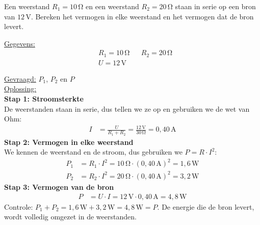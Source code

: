 \documentclass{ximera}
\begin{document}
\begin{example}[foldable=true,title={Voorbeeld: vermogen in een serieschakeling}]\nl
    Een weerstand $R_1 = 10\,\mathrm{\Omega}$ en een weerstand $R_2 = 20\,\mathrm{\Omega}$ staan in serie op een bron van $12\,\mathrm{V}$. Bereken het vermogen in elke weerstand en het vermogen dat de bron levert.

    \begin{solution}\nl
        \underline{Gegevens:}
        \begin{align*}
            & R_1 = 10\,\mathrm{\Omega} & & R_2 = 20\,\mathrm{\Omega} \\
            & U = 12\,\mathrm{V} & &
        \end{align*}

        \underline{Gevraagd:} $P_1$, $P_2$ en $P$ \\

        \underline{Oplossing:}\\
        \textbf{Stap 1: Stroomsterkte}\\
        De weerstanden staan in serie, dus tellen we ze op en gebruiken we de wet van Ohm:
        \begin{align*}
            I &= \frac{U}{R_1 + R_2} = \frac{12\,\mathrm{V}}{30\,\mathrm{\Omega}} = 0{,}40\,\mathrm{A}
        \end{align*}
        \textbf{Stap 2: Vermogen in elke weerstand}\\
        We kennen de weerstand en de stroom, dus gebruiken we $P = R \cdot I^{2}$:
        \begin{align*}
            P_1 &= R_1 \cdot I^{2} = 10\,\mathrm{\Omega} \cdot (0{,}40\,\mathrm{A})^{2} = \boxed{1{,}6\,\mathrm{W}} \\
            P_2 &= R_2 \cdot I^{2} = 20\,\mathrm{\Omega} \cdot (0{,}40\,\mathrm{A})^{2} = \boxed{3{,}2\,\mathrm{W}}
        \end{align*}
        \textbf{Stap 3: Vermogen van de bron}
        \begin{align*}
            P &= U \cdot I = 12\,\mathrm{V} \cdot 0{,}40\,\mathrm{A} = \boxed{4{,}8\,\mathrm{W}}
        \end{align*}
        Controle: $P_1 + P_2 = 1{,}6\,\mathrm{W} + 3{,}2\,\mathrm{W} = 4{,}8\,\mathrm{W} = P$. De energie die de bron levert, wordt volledig omgezet in de weerstanden.
    \end{solution}
\end{example}
\end{document}
